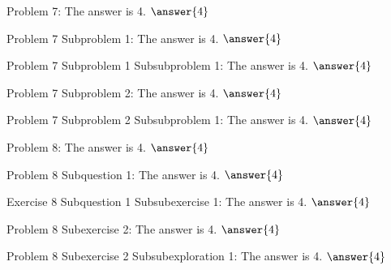 \documentclass{ximera}
\begin{document}
\begin{problem}
    Problem 7: The answer is 4. $\answer{4}$
    \begin{problem}
        Problem 7 Subproblem 1: The answer is 4. $\answer{4}$
        \begin{problem}
            Problem 7 Subproblem 1 Subsubproblem 1: The answer is 4. $\answer{4}$
        \end{problem} 
    \end{problem}
    \begin{problem}
        Problem 7 Subproblem 2: The answer is 4. $\answer{4}$
        \begin{problem}
            Problem 7 Subproblem 2 Subsubproblem 1: The answer is 4. $\answer{4}$
        \end{problem} 
    \end{problem} 
\end{problem} 

\begin{problem}
    Problem 8: The answer is 4. $\answer{4}$
    \begin{question}
        Problem 8 Subquestion 1: The answer is 4. $\answer{4}$
        \begin{exercise}
            Exercise 8 Subquestion 1 Subsubexercise 1: The answer is 4. $\answer{4}$
        \end{exercise}
    \end{question}
    \begin{exercise}
        Problem 8 Subexercise 2: The answer is 4. $\answer{4}$
        \begin{exploration}
            Problem 8 Subexercise 2 Subsubexploration 1: The answer is 4. $\answer{4}$
        \end{exploration}
    \end{exercise}
\end{problem}


\hrulefill
\end{document}
